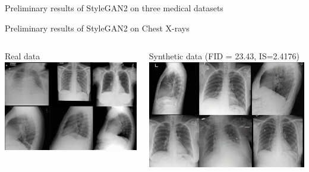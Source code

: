 \documentclass[8pt,xcolor=table,aspectratio=169]{beamer}
\begin{document}
\begin{frame}[plain, c]

\begin{center}
\Huge Preliminary results of StyleGAN2 on three medical datasets
\end{center}

\end{frame}


\begin{frame}{Preliminary results of StyleGAN2 on Chest X-rays}
\begin{columns}
\begin{column}{0.5\textwidth}
\centering
Real data
\includegraphics[width=\textwidth]{hhpMkd8.png}
\end{column}
\begin{column}{0.5\textwidth}
\centering
Synthetic data (FID = 23.43, IS=2.4176) %
\includegraphics[width=\textwidth]{Z0XeRg3.jpg} %
\end{column}
\end{columns}


\end{frame}
\end{document}
